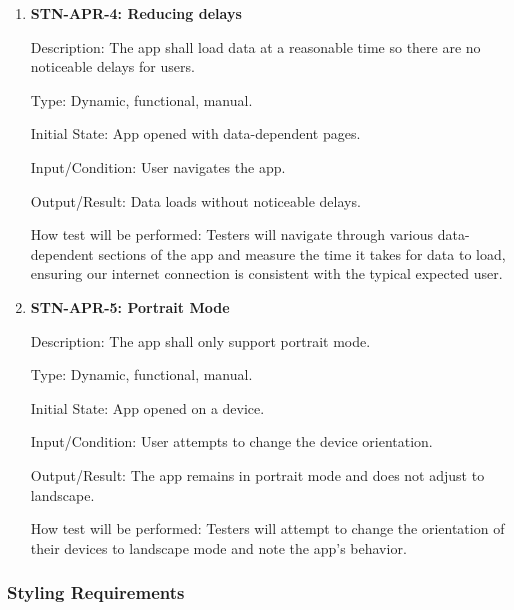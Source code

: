 \documentclass[12pt, titlepage]{article}
\begin{document}
\begin{enumerate}
\item \textbf{STN-APR-4: Reducing delays}

Description: The app shall load data at a reasonable time so there are no noticeable delays for users.

Type: Dynamic, functional, manual.

Initial State: App opened with data-dependent pages.

Input/Condition: User navigates the app.

Output/Result: Data loads without noticeable delays.

How test will be performed: Testers will navigate through various data-dependent sections of the app and measure the time it takes for data to load, ensuring our internet connection is consistent with the typical expected user. 


\item {\textbf{STN-APR-5: Portrait Mode}}

Description: The app shall only support portrait mode.

Type: Dynamic, functional, manual.

Initial State: App opened on a device.

Input/Condition: User attempts to change the device orientation.

Output/Result: The app remains in portrait mode and does not adjust to landscape.

How test will be performed: Testers will attempt to change the orientation of their devices to landscape mode and note the app's behavior.

\end{enumerate}


\subsubsection{Styling Requirements}
\end{document}
